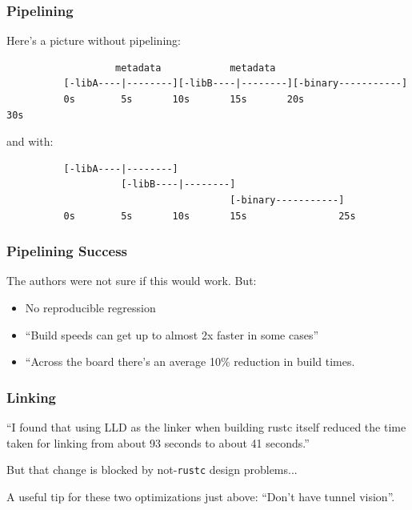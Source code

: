 \begin{frame}[fragile]
\frametitle{Pipelining}

 Here's a picture without pipelining:
{\scriptsize
\begin{verbatim}
                   metadata            metadata
          [-libA----|--------][-libB----|--------][-binary-----------]
          0s        5s       10s       15s       20s                30s
\end{verbatim}
}
and with:
{\scriptsize
\begin{verbatim}
          [-libA----|--------]
                    [-libB----|--------]
                                       [-binary-----------]
          0s        5s       10s       15s                25s
\end{verbatim}
}

\end{frame}

\begin{frame}
\frametitle{Pipelining Success}

The authors were not sure if this would work. But:

\begin{itemize}
\item No reproducible regression
\item    ``Build speeds can get up to almost 2x faster in some cases''
\item    ``Across the board there's an average 10\% reduction in build times.\end{itemize}


\end{frame}


\begin{frame}
\frametitle{Linking}

``I found that using LLD as the linker when building rustc itself
reduced the time taken for linking from about 93 seconds to about 41
seconds.'' 

But that change is blocked by not-\texttt{rustc} design problems...

A useful tip for these two optimizations just
above: ``Don't have tunnel vision''.

\end{frame}




